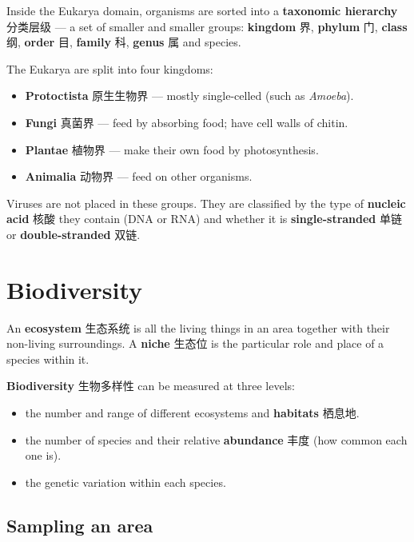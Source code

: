 \documentclass[11pt]{article}
\begin{document}
Inside the Eukarya domain, organisms are sorted into a \textbf{taxonomic hierarchy} 分类层级 — a set of smaller and smaller groups: \textbf{kingdom} 界, \textbf{phylum} 门, \textbf{class} 纲, \textbf{order} 目, \textbf{family} 科, \textbf{genus} 属 and species.

The Eukarya are split into four kingdoms:

\begin{itemize}
\item \textbf{Protoctista} 原生生物界 — mostly single-celled (such as \emph{Amoeba}).

\item \textbf{Fungi} 真菌界 — feed by absorbing food; have cell walls of chitin.

\item \textbf{Plantae} 植物界 — make their own food by photosynthesis.

\item \textbf{Animalia} 动物界 — feed on other organisms.

\end{itemize}

Viruses are not placed in these groups. They are classified by the type of \textbf{nucleic acid} 核酸 they contain (DNA or RNA) and whether it is \textbf{single-stranded} 单链 or \textbf{double-stranded} 双链.

\section*{Biodiversity}

An \textbf{ecosystem} 生态系统 is all the living things in an area together with their non-living surroundings. A \textbf{niche} 生态位 is the particular role and place of a species within it.

\textbf{Biodiversity} 生物多样性 can be measured at three levels:

\begin{itemize}
\item the number and range of different ecosystems and \textbf{habitats} 栖息地.

\item the number of species and their relative \textbf{abundance} 丰度 (how common each one is).

\item the genetic variation within each species.

\end{itemize}

\subsection*{Sampling an area}
\end{document}
